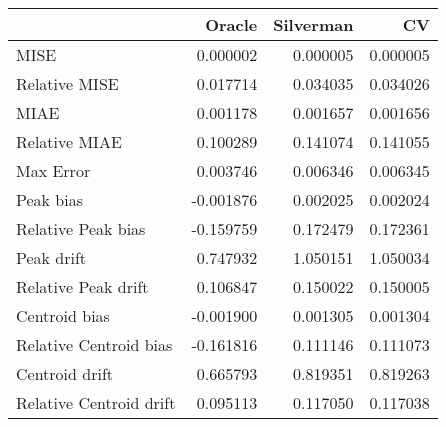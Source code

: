 \begin{tabular}{lrrr}
  \hline
 & Oracle & Silverman & CV \\ 
  \hline
MISE & 0.000002 & 0.000005 & 0.000005 \\ 
  Relative MISE & 0.017714 & 0.034035 & 0.034026 \\ 
  MIAE & 0.001178 & 0.001657 & 0.001656 \\ 
  Relative MIAE & 0.100289 & 0.141074 & 0.141055 \\ 
  Max Error & 0.003746 & 0.006346 & 0.006345 \\ 
  Peak bias & -0.001876 & 0.002025 & 0.002024 \\ 
  Relative Peak bias & -0.159759 & 0.172479 & 0.172361 \\ 
  Peak drift & 0.747932 & 1.050151 & 1.050034 \\ 
  Relative Peak drift & 0.106847 & 0.150022 & 0.150005 \\ 
  Centroid bias & -0.001900 & 0.001305 & 0.001304 \\ 
  Relative Centroid bias & -0.161816 & 0.111146 & 0.111073 \\ 
  Centroid drift & 0.665793 & 0.819351 & 0.819263 \\ 
  Relative Centroid drift & 0.095113 & 0.117050 & 0.117038 \\ 
   \hline
\end{tabular}
